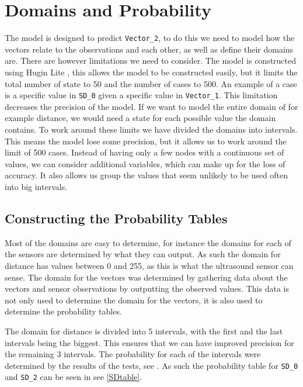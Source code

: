 \section{Domains and Probability}\label{MID}

The model is designed to predict \texttt{Vector\_2}, to do this we need to
model how the vectors relate to the observations and each other, as well as
define their domains are. There are however limitations we need to consider. The
model is constructed using Hugin Lite \citep{Hugin}, this allows the model to
be constructed easily, but it limits the total number of state to 50 and
the number of cases to 500. An example of a case is a specific value in \texttt{SD\_0}
given a specific value in \texttt{Vector\_1}. This limitation decreases the
precision of the model. If we want to model the entire domain of for example
distance, we would need a state for each possible value the domain
contains. To work around these limits we have divided
the domains into intervals. This means the model lose some precision, but it
allows us to work around the limit of 500 cases. Instead of having only a few
nodes with a continuous set of values, we can consider additional variables,
which can  make up for the loss of accuracy. It also allows us group the values
that seem unlikely to be used often into big intervals.

\subsection{Constructing the Probability Tables}

Most of the domains are easy to determine, for instance the domains for each of
the sensors are determined by what they can output. As such the domain for
distance has values between 0 and 255, as this is what the ultrasound sensor
can sense. The domain for the vectors was determined by gathering data about the
vectors and sensor observations by outputting the observed values. This data is
not only used to determine the domain for the vectors, it is also used to
determine the probability tables.\nl


The domain for distance is divided into 5 intervals, with the first and the last
intervals being the biggest. This ensures that we can have improved precision
for the remaining 3 intervals. The probability for each of the intervals were
determined by the results of the tests, see . As such
the probability table for \texttt{SD\_0} and \texttt{SD\_2} can be seen in see
\autoref{SDtable}.

